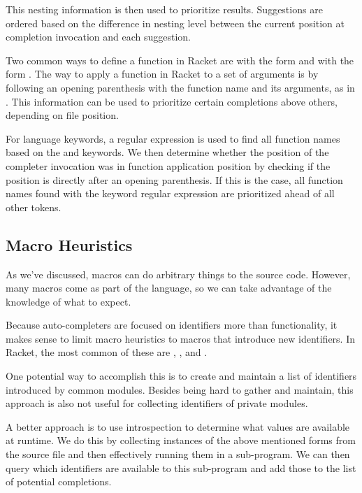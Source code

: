 \documentclass[ms,electronic,twosidetoc,letterpaper,chaptercenter,parttop,lol,lof,lot]{byumsphd}
\begin{document}
This nesting information is then used to prioritize results.
Suggestions are ordered based on the difference in nesting level between the current position at completion invocation and each suggestion.

Two common ways to define a function in Racket are with the form  and with the form .
The way to apply a function in Racket to a set of arguments is by following an opening parenthesis with the function name and its arguments, as in .
This information can be used to prioritize certain completions above others, depending on file position.

For language keywords, a regular expression is used to find all function names based on the  and  keywords.
We then determine whether the position of the completer invocation was in function application position by checking if the position is directly after an opening parenthesis.
If this is the case, all function names found with the keyword regular expression are prioritized ahead of all other tokens.

\subsection{Macro Heuristics}

As we've discussed, macros can do arbitrary things to the source code.
However, many macros come as part of the language, so we can take advantage of the knowledge of what to expect.

Because auto-completers are focused on identifiers more than functionality, it makes sense to limit macro heuristics to macros that introduce new identifiers.
In Racket, the most common of these are , , and .

One potential way to accomplish this is to create and maintain a list of identifiers introduced by common modules.
Besides being hard to gather and maintain, this approach is also not useful for collecting identifiers of private modules.

A better approach is to use introspection to determine what values are available at runtime.
We do this by collecting instances of the above mentioned forms from the source file and then effectively running them in a sub-program.
We can then query which identifiers are available to this sub-program and add those to the list of potential completions.
\end{document}
